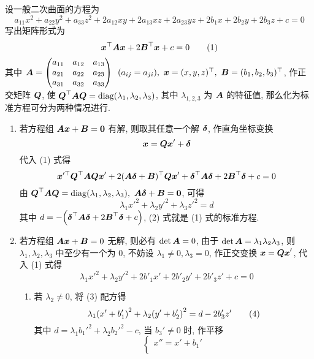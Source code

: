 设一般二次曲面的方程为
$$a_{11}x^2+a_{22}y^2+a_{33}z^2+2a_{12}xy+2a_{13}xz+2a_{23}yz+2b_1x+2b_2y+2b_3z+c=0$$
写出矩阵形式为
\begin{equation*}
    \vb*{x}^\top\vb*{Ax}+2\vb*{B}^\top\vb*{x}+c=0
    \tag{1}
\end{equation*}
其中 $\vb*{A}=\mqty(\xmat*{a}{3}{3})~~(a_{ij}=a_{ji}),~\vb*{x}=(x,y,z)^\top,~\vb*{B}=(b_1,b_2,b_3)^\top$,
作正交矩阵 $\vb*{Q}$, 使 $\vb*{Q}^\top\vb*{AQ}=\diag(\lambda_1,\lambda_2,\lambda_3)$, 其中 $\lambda_{1,2,3}$ 为 $\vb*{A}$ 的特征值, 那么化为标准方程可分为两种情况进行.
\begin{enumerate}[label=(\arabic{*})]
    \item 若方程组 $\vb*{Ax}+\vb*{B}=\vb*{0}$ 有解, 则取其任意一个解 $\vb*{\delta}$, 作直角坐标变换 $$\vb*{x}=\vb*{Qx}'+\vb*{\delta}$$ 代入 (1) 式得
          $$\vb*{x}'^\top\vb*{Q}^\top\vb*{AQx}'+2(\vb*{A\delta}+\vb*{B})^\top\vb*{Qx}'+\vb*{\delta}^\top\vb*{A\delta}+2\vb*{B}^\top\vb*{\delta}+c=0$$
          由 $\vb*{Q}^\top\vb*{AQ}=\diag(\lambda_1,\lambda_2,\lambda_3),~\vb*{A\delta}+\vb*{B}=\vb*{0}$, 可得
          \begin{equation*}
              \lambda_1 x'^2+\lambda_2 y'^2+\lambda_3 z'^2=d
              \tag{2}
          \end{equation*}
          其中 $d=-\qty(\vb*{\delta}^\top\vb*{A\delta}+2\vb*{B}^\top\vb*{\delta}+c)$, (2) 式就是 (1) 式的标准方程.
    \item 若方程组 $\vb*{Ax}+\vb*{B}=0$ 无解, 则必有 $\det\vb*{A}=0$, 由于 $\det\vb*{A}=\lambda_1\lambda_2\lambda_3$, 则 $\lambda_1,\lambda_2,\lambda_3$ 中至少有一个为 0, 不妨设 $\lambda_1\neq 0,\lambda_3=0$, 作正交变换 $\vb*{x}=\vb*{Qx}'$, 代入 (1) 式得
          \begin{equation*}
              \lambda_1x'^2+\lambda_2y'^2+2b'_1x'+2b'_2y'+2b'_3z'+c=0
              \tag{3}
          \end{equation*}
          \begin{enumerate}[label=(\roman{*})]
              \item 若 $\lambda_2\neq0$, 将 (3) 配方得
                    \begin{equation*}
                        \lambda_1\qty(x'+b_1')^2+\lambda_2\qty(y'+b_2')^2=d-2b_3'z'
                        \tag{4}
                    \end{equation*}
                    其中 $d=\lambda_1b_1'^2+\lambda_2b_2'^2-c$, 当 $b_3'\neq0$ 时, 作平移 $$\begin{cases}
                            x''=x'+b_1' \\

\end{cases}$$
\end{enumerate}
\end{enumerate}
